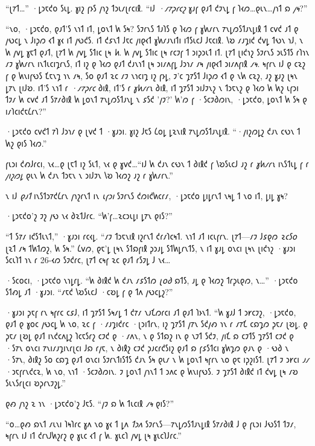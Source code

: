 “𐑚𐑳𐑑…” ·𐑛𐑮𐑱𐑒𐑴 𐑕𐑧𐑛. 𐑣𐑦𐑟 𐑝𐑶𐑕 𐑢𐑪𐑟 𐑑𐑮𐑧𐑥𐑚𐑩𐑤𐑦𐑙. “𐑦𐑓 \emph{·𐑥𐑳𐑜𐑩𐑤𐑟} 𐑣𐑨𐑝 𐑞𐑨𐑑 𐑒𐑲𐑯𐑛 𐑝 𐑐𐑬𐑼…𐑞𐑧𐑯…𐑢𐑪𐑑 𐑸 \emph{𐑢𐑰}?”

“𐑯𐑴, ·𐑛𐑮𐑱𐑒𐑴, 𐑞𐑨𐑑'𐑕 𐑯𐑪𐑑 𐑦𐑑, 𐑛𐑴𐑯𐑑 𐑿 𐑕𐑰? 𐑕𐑲𐑩𐑯𐑕 𐑑𐑨𐑐𐑕 𐑞 𐑐𐑬𐑼 𐑝 𐑣𐑿𐑥𐑩𐑯 𐑳𐑯𐑛𐑼𐑕𐑑𐑨𐑯𐑛𐑦𐑙 𐑑 𐑤𐑫𐑒 𐑨𐑑 𐑞 𐑢𐑻𐑤𐑛 𐑯 𐑓𐑦𐑜𐑼 𐑬𐑑 𐑣𐑬 𐑦𐑑 𐑢𐑻𐑒𐑕. 𐑦𐑑 𐑒𐑭𐑯𐑑 𐑓𐑱𐑤 𐑢𐑦𐑞𐑬𐑑 𐑣𐑿𐑥𐑨𐑯𐑦𐑑𐑦 𐑦𐑑𐑕𐑧𐑤𐑓 𐑓𐑱𐑤𐑦𐑙. 𐑘𐑹 𐑥𐑨𐑡𐑦𐑒 𐑒𐑫𐑛 𐑑𐑻𐑯 𐑪𐑓, 𐑯 𐑿 𐑢𐑫𐑛 𐑣𐑱𐑑 𐑞𐑨𐑑, 𐑚𐑳𐑑 𐑿 𐑢𐑫𐑛 𐑕𐑑𐑦𐑤 𐑚𐑰 \emph{𐑿}. 𐑿 𐑢𐑫𐑛 𐑕𐑑𐑦𐑤 𐑚𐑰 𐑩𐑤𐑲𐑝 𐑑 𐑮𐑦𐑜𐑮𐑧𐑑 𐑦𐑑. 𐑚𐑳𐑑 𐑚𐑦𐑒𐑪𐑟 𐑕𐑲𐑩𐑯𐑕 𐑮𐑧𐑕𐑑𐑕 𐑩𐑐𐑪𐑯 𐑥𐑲 𐑣𐑿𐑥𐑩𐑯 𐑦𐑯𐑑𐑧𐑤𐑦𐑡𐑩𐑯𐑕, 𐑦𐑑 𐑦𐑟 𐑞 𐑐𐑬𐑼 𐑞𐑨𐑑 𐑒𐑨𐑯𐑪𐑑 𐑚𐑰 𐑮𐑦𐑥𐑵𐑝𐑛 𐑓𐑮𐑪𐑥 𐑥𐑰 𐑢𐑦𐑞𐑬𐑑 𐑮𐑦𐑥𐑵𐑝𐑦𐑙 \emph{𐑥𐑰}. 𐑰𐑝𐑩𐑯 𐑦𐑓 𐑞 𐑤𐑷𐑟 𐑝 𐑞 𐑿𐑯𐑦𐑝𐑻𐑕 𐑗𐑱𐑯𐑡 𐑪𐑯 𐑥𐑰, 𐑕𐑴 𐑞𐑨𐑑 𐑷𐑤 𐑥𐑲 𐑯𐑪𐑤𐑦𐑡 𐑦𐑟 𐑝𐑶𐑛, 𐑲'𐑤 𐑡𐑳𐑕𐑑 𐑓𐑦𐑜𐑼 𐑬𐑑 𐑞 𐑯𐑿 𐑤𐑷𐑟, 𐑨𐑟 𐑣𐑨𐑟 𐑚𐑰𐑯 𐑛𐑳𐑯 𐑚𐑦𐑓𐑹. 𐑦𐑑'𐑕 𐑯𐑪𐑑 𐑩 \emph{·𐑥𐑳𐑜𐑩𐑤} 𐑔𐑦𐑙, 𐑦𐑑'𐑕 𐑩 \emph{𐑣𐑿𐑥𐑩𐑯} 𐑔𐑦𐑙, 𐑦𐑑 𐑡𐑳𐑕𐑑 𐑮𐑦𐑓𐑲𐑯𐑟 𐑯 𐑑𐑮𐑱𐑯𐑟 𐑞 𐑐𐑬𐑼 𐑿 𐑿𐑟 𐑧𐑝𐑮𐑦 𐑑𐑲𐑥 𐑿 𐑤𐑫𐑒 𐑨𐑑 𐑕𐑳𐑥𐑔𐑦𐑙 𐑿 𐑛𐑴𐑯𐑑 𐑳𐑯𐑛𐑼𐑕𐑑𐑨𐑯𐑛 𐑯 𐑭𐑕𐑒 '𐑢𐑲?' 𐑿'𐑼 𐑝 ·𐑕𐑤𐑲𐑔𐑼𐑦𐑯, ·𐑛𐑮𐑱𐑒𐑴, 𐑛𐑴𐑯𐑑 𐑿 𐑕𐑰 𐑞 𐑦𐑥𐑐𐑤𐑦𐑒𐑱𐑖𐑩𐑯?”

·𐑛𐑮𐑱𐑒𐑴 𐑤𐑫𐑒𐑑 𐑳𐑐 𐑓𐑮𐑪𐑥 𐑞 𐑚𐑫𐑒 𐑑 ·𐑣𐑨𐑮𐑦. 𐑣𐑦𐑟 𐑓𐑱𐑕 𐑖𐑴𐑛 𐑛𐑷𐑯𐑦𐑙 𐑳𐑯𐑛𐑼𐑕𐑑𐑨𐑯𐑛𐑦𐑙. “·𐑢𐑦𐑟𐑼𐑛𐑟 𐑒𐑨𐑯 𐑤𐑻𐑯 𐑑 𐑿𐑟 𐑞𐑦𐑕 𐑐𐑬𐑼.”

𐑝𐑧𐑮𐑦 𐑒𐑺𐑓𐑩𐑤𐑦, 𐑯𐑬…𐑞 𐑚𐑱𐑑 𐑦𐑟 𐑕𐑧𐑑, 𐑯𐑬 𐑞 𐑣𐑫𐑒…“𐑦𐑓 𐑿 𐑒𐑨𐑯 𐑤𐑻𐑯 𐑑 𐑔𐑦𐑙𐑒 𐑝 𐑘𐑹𐑕𐑧𐑤𐑓 𐑨𐑟 𐑩 \emph{𐑣𐑿𐑥𐑩𐑯} 𐑦𐑯𐑕𐑑𐑧𐑛 𐑝 𐑩 \emph{𐑢𐑦𐑟𐑼𐑛} 𐑞𐑧𐑯 𐑿 𐑒𐑨𐑯 𐑑𐑮𐑱𐑯 𐑯 𐑮𐑦𐑓𐑲𐑯 𐑘𐑹 𐑐𐑬𐑼𐑟 𐑨𐑟 𐑩 𐑣𐑿𐑥𐑩𐑯.”

𐑯 𐑦𐑓 \emph{𐑞𐑨𐑑} 𐑦𐑯𐑕𐑑𐑮𐑳𐑒𐑖𐑩𐑯 𐑢𐑪𐑟𐑩𐑯𐑑 𐑦𐑯 \emph{𐑧𐑝𐑮𐑦} 𐑕𐑲𐑩𐑯𐑕 𐑒𐑼𐑦𐑒𐑿𐑤𐑩𐑥, ·𐑛𐑮𐑱𐑒𐑴 𐑛𐑦𐑛𐑩𐑯𐑑 𐑯𐑰𐑛 𐑑 𐑯𐑴 𐑦𐑑, 𐑛𐑦𐑛 𐑣𐑰?

·𐑛𐑮𐑱𐑒𐑴'𐑟 𐑲𐑟 𐑢𐑻 𐑯𐑬 𐑔𐑷𐑑𐑓𐑩𐑤. “𐑿'𐑝…𐑷𐑤𐑮𐑧𐑛𐑦 𐑛𐑳𐑯 𐑞𐑦𐑕?”

“𐑑 𐑕𐑳𐑥 𐑦𐑒𐑕𐑑𐑧𐑯𐑑,” ·𐑣𐑨𐑮𐑦 𐑩𐑤𐑬𐑛. “𐑥𐑲 𐑑𐑮𐑱𐑯𐑦𐑙 𐑦𐑟𐑩𐑯𐑑 𐑒𐑩𐑥𐑐𐑤𐑰𐑑. 𐑯𐑪𐑑 𐑨𐑑 𐑦𐑤𐑧𐑝𐑩𐑯. 𐑚𐑳𐑑—𐑥𐑲 𐑓𐑭𐑞𐑼 \emph{𐑷𐑤𐑕𐑴} 𐑚𐑷𐑑 𐑥𐑰 𐑑𐑿𐑑𐑼𐑟, 𐑿 𐑕𐑰.” 𐑖𐑫𐑼, 𐑞𐑱'𐑛 𐑚𐑰𐑯 𐑕𐑑𐑸𐑝𐑦𐑙 𐑜𐑮𐑨𐑛 𐑕𐑑𐑿𐑛𐑩𐑯𐑑𐑕, 𐑯 𐑦𐑑 𐑣𐑨𐑛 𐑴𐑯𐑤𐑦 𐑚𐑰𐑯 𐑚𐑦𐑒𐑪𐑟 ·𐑣𐑨𐑮𐑦 𐑕𐑤𐑧𐑐𐑑 𐑪𐑯 𐑩 26-𐑬𐑼 𐑕𐑲𐑒𐑩𐑤, 𐑚𐑳𐑑 𐑤𐑰𐑝 𐑷𐑤 𐑞𐑨𐑑 𐑩𐑕𐑲𐑛 𐑓 𐑯𐑬…

·𐑕𐑤𐑴𐑤𐑦, ·𐑛𐑮𐑱𐑒𐑴 𐑯𐑪𐑛𐑩𐑛. “𐑿 𐑔𐑦𐑙𐑒 𐑿 𐑒𐑨𐑯 𐑥𐑭𐑕𐑑𐑼 \emph{𐑚𐑴𐑔} 𐑸𐑑𐑕, 𐑨𐑛 𐑞 𐑐𐑬𐑼𐑟 𐑑𐑩𐑜𐑧𐑞𐑼, 𐑯…” ·𐑛𐑮𐑱𐑒𐑴 𐑕𐑑𐑺𐑛 𐑨𐑑 ·𐑣𐑨𐑮𐑦. “𐑥𐑱𐑒 𐑘𐑹𐑕𐑧𐑤𐑓 ·𐑤𐑹𐑛 𐑝 𐑞 𐑑𐑵 𐑢𐑻𐑤𐑛𐑟?”

·𐑣𐑨𐑮𐑦 𐑜𐑱𐑝 𐑩𐑯 𐑰𐑝𐑩𐑤 𐑤𐑭𐑓, 𐑦𐑑 𐑡𐑳𐑕𐑑 𐑕𐑰𐑥𐑛 𐑑 𐑒𐑳𐑥 𐑯𐑨𐑗𐑼𐑩𐑤𐑦 𐑨𐑑 𐑞𐑨𐑑 𐑐𐑶𐑯𐑑. “𐑿 𐑣𐑨𐑓 𐑑 𐑮𐑾𐑤𐑲𐑟, ·𐑛𐑮𐑱𐑒𐑴, 𐑞𐑨𐑑 𐑞 𐑣𐑴𐑤 𐑢𐑻𐑤𐑛 𐑿 𐑯𐑴, 𐑷𐑤 𐑝 ·𐑥𐑨𐑡𐑦𐑒𐑩𐑤 ·𐑚𐑮𐑦𐑑𐑩𐑯, 𐑦𐑟 𐑡𐑳𐑕𐑑 𐑢𐑳𐑯 𐑕𐑒𐑢𐑺 𐑪𐑯 𐑩 𐑥𐑳𐑗 𐑤𐑸𐑡𐑼 𐑜𐑱𐑥 𐑚𐑹𐑛. 𐑞 𐑜𐑱𐑥 𐑚𐑹𐑛 𐑞𐑨𐑑 𐑦𐑯𐑒𐑤𐑵𐑛𐑟 𐑐𐑤𐑱𐑕𐑩𐑟 𐑤𐑲𐑒 𐑞 ·𐑥𐑵𐑯, 𐑯 𐑞 𐑕𐑑𐑸𐑟 𐑦𐑯 𐑞 𐑯𐑲𐑑 𐑕𐑒𐑲, 𐑢𐑦𐑗 𐑸 𐑤𐑲𐑑𐑕 𐑡𐑳𐑕𐑑 𐑤𐑲𐑒 𐑞 ·𐑕𐑳𐑯 𐑴𐑯𐑤𐑦 𐑳𐑯𐑦𐑥𐑨𐑡𐑦𐑯𐑩𐑚𐑤𐑦 𐑓𐑸 𐑩𐑢𐑱, 𐑯 𐑔𐑦𐑙𐑟 𐑤𐑲𐑒 𐑜𐑨𐑤𐑩𐑒𐑕𐑦𐑟 𐑞𐑨𐑑 𐑸 𐑝𐑭𐑕𐑑𐑤𐑦 𐑣𐑿𐑡𐑼 𐑞𐑨𐑯 𐑞 ·𐑻𐑔 𐑯 ·𐑕𐑳𐑯, 𐑔𐑦𐑙𐑟 𐑕𐑴 𐑤𐑸𐑡 𐑞𐑨𐑑 𐑴𐑯𐑤𐑦 𐑕𐑲𐑩𐑯𐑑𐑦𐑕𐑑𐑕 𐑒𐑨𐑯 𐑕𐑰 𐑞𐑧𐑥 𐑯 𐑿 𐑛𐑴𐑯𐑑 𐑰𐑝𐑩𐑯 𐑯𐑴 𐑞𐑱 𐑦𐑜𐑟𐑦𐑕𐑑. 𐑚𐑳𐑑 𐑲 𐑮𐑾𐑤𐑦 \emph{𐑨𐑥} ·𐑮𐑱𐑝𐑩𐑯𐑒𐑤𐑷, 𐑿 𐑯𐑴, 𐑯𐑪𐑑 ·𐑕𐑤𐑲𐑔𐑼𐑦𐑯. 𐑲 𐑛𐑴𐑯𐑑 𐑢𐑪𐑯𐑑 𐑑 𐑮𐑵𐑤 𐑞 𐑿𐑯𐑦𐑝𐑻𐑕. 𐑲 𐑡𐑳𐑕𐑑 𐑔𐑦𐑙𐑒 𐑦𐑑 𐑒𐑫𐑛 𐑚𐑰 𐑥𐑹 𐑕𐑧𐑯𐑕𐑩𐑚𐑤𐑦 𐑹𐑜𐑩𐑯𐑲𐑟𐑛.”

𐑞𐑺 𐑢𐑪𐑟 𐑷 𐑪𐑯 ·𐑛𐑮𐑱𐑒𐑴'𐑟 𐑓𐑱𐑕. “𐑢𐑲 𐑸 𐑿 𐑑𐑧𐑤𐑦𐑙 \emph{𐑥𐑰} 𐑞𐑦𐑕?”

“𐑴…𐑞𐑺 𐑸𐑯𐑑 𐑥𐑧𐑯𐑦 𐑐𐑰𐑐𐑩𐑤 𐑣𐑵 𐑯𐑴 𐑣𐑬 𐑑 𐑛𐑵 \emph{𐑑𐑮𐑵} 𐑕𐑲𐑩𐑯𐑕—𐑳𐑯𐑛𐑼𐑕𐑑𐑨𐑯𐑛𐑦𐑙 𐑕𐑳𐑥𐑔𐑦𐑙 𐑓 𐑞 𐑝𐑧𐑮𐑦 𐑓𐑻𐑕𐑑 𐑑𐑲𐑥, 𐑰𐑝𐑩𐑯 𐑦𐑓 𐑦𐑑 𐑒𐑩𐑯𐑓𐑿𐑟𐑩𐑟 𐑞 𐑣𐑧𐑤 𐑬𐑑 𐑝 𐑿. 𐑣𐑧𐑤𐑐 𐑢𐑫𐑛 𐑚𐑰 𐑣𐑧𐑤𐑐𐑓𐑩𐑤.”

